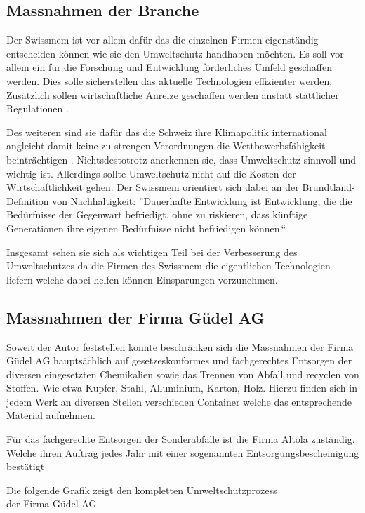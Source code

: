 \subsection{Massnahmen der Branche}
\label{sec:orgafcd1eb}
Der Swissmem ist vor allem dafür das die einzelnen Firmen eigenständig
entscheiden können wie sie den Umweltschutz handhaben möchten.  Es
soll vor allem ein für die Forschung und Entwicklung förderliches
Umfeld geschaffen werden. Dies solle sicherstellen das aktuelle
Technologien effizienter werden. Zusätzlich sollen wirtschaftliche
Anreize geschaffen werden anstatt stattlicher Regulationen
\cite{ref5}.

Des weiteren sind sie dafür das die Schweiz ihre
Klimapolitik international angleicht damit keine zu strengen
Verordnungen die Wettbewerbsfähigkeit beinträchtigen
\cite{ref4}. Nichtsdestotrotz anerkennen sie, dass Umweltschutz
sinnvoll und wichtig ist. Allerdings sollte Umweltschutz nicht auf die
Kosten der Wirtschaftlichkeit gehen. Der Swissmem orientiert
sich dabei an der Brundtland-Definition von Nachhaltigkeit:
''Dauerhafte Entwicklung ist Entwicklung, die die Bedürfnisse der
Gegenwart befriedigt, ohne zu riskieren, dass künftige Generationen
ihre eigenen Bedürfnisse nicht befriedigen können.`` \cite{ref5}

Insgesamt sehen sie sich als wichtigen Teil bei der Verbesserung des
Umweltschutzes da die Firmen des Swissmem die eigentlichen
Technologien liefern welche dabei helfen können Einsparungen
vorzunehmen.
\newpage
\subsection{Massnahmen der Firma Güdel AG}
\label{sec:org1e85043}
Soweit der Autor feststellen konnte beschränken sich die Massnahmen
der Firma Güdel AG hauptsächlich auf gesetzeskonformes und
fachgerechtes Entsorgen der diversen eingesetzten Chemikalien sowie
das Trennen von Abfall und recyclen von Stoffen. Wie etwa Kupfer,
Stahl, Alluminium, Karton, Holz.  Hierzu finden sich in jedem Werk an
diversen Stellen verschieden Container welche das entsprechende
Material aufnehmen.

Für das fachgerechte Entsorgen der Sonderabfälle ist die Firma Altola
zuständig. Welche ihren Auftrag jedes Jahr mit einer sogenannten
Entsorgungsbescheinigung bestätigt \cite{ref10}

Die folgende Grafik zeigt den kompletten Umweltschutzprozess\\
der Firma Güdel AG \cite{ref9}

